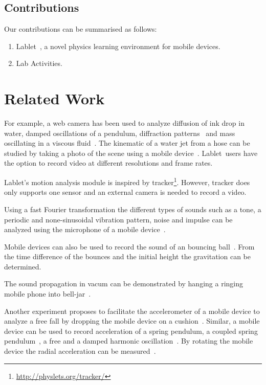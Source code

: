 \documentclass{sigchi}
\newcommand{\lablet}{Lablet\ }
\begin{document}
\subsection{Contributions}
Our contributions can be summarised as follows:

\begin{enumerate}
\item \lablet, a novel physics learning environment for mobile devices.
\item Lab Activities.
\end{enumerate}

\section{Related Work}
For example, a web camera has been used to analyze diffusion of ink drop in water, damped oscillations of a pendulum, diffraction patterns~\cite{Nedev2006} and mass oscillating in a viscous fluid~\cite{Shamim2010}.
The kinematic of a water jet from a hose can be studied by taking a photo of the scene using a mobile device~\cite{Falcao2009}. \lablet users have the option to record video at different resolutions and
frame rates.

Lablet's motion analysis module is inspired by tracker\footnote{\url{http://physlets.org/tracker/}}.
However, tracker does only supports one sensor and an external camera is needed to record a video.

Using a fast Fourier transformation the different types of sounds such as a tone, a periodic and none-sinusoidal vibration pattern, noise and impulse can be analyzed using the microphone of a mobile device~\cite{KuhnAcousticPhenomena2013}.

Mobile devices can also be used to record the sound of an bouncing ball~\cite{Schwarz2013Acoustic}.
From the time difference of the bounces and the initial height the gravitation can be determined.

The sound propagation in vacum can be demonstrated by hanging a ringing mobile phone into bell-jar~\cite{CaleonBellJar2013}.



Another experiment proposes to facilitate the accelerometer of a mobile device to analyze a free fall by dropping the mobile device on a cushion~\cite{VogtFreeFall2012}.
Similar, a mobile device can be used to record acceleration of a spring pendulum, a coupled spring pendulum~\cite{KuhnPendulum2012}, a free and a damped harmonic oscillation~\cite{Castro2013}.
By rotating the mobile device the radial acceleration can be measured~\cite{VogtRadialAcc2013}.
\end{document}
